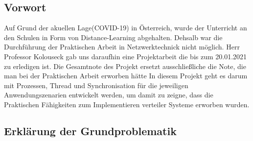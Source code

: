 \documentclass[a4paper,12pt]{exam}
\begin{document}
\subsection{Vorwort}
Auf Grund der akuellen Lage(COVID-19) in Österreich, wurde der Unterricht an den Schulen
in Form von Distance-Learning abgehalten. Dehsalb war die Durchführung der Praktischen Arbeit in
Netzwerktechnick nicht möglich. Herr Professor Kolouseck gab uns daraufhin eine Projektarbeit die bis zum 
20.01.2021 zu erledigen ist. Die Gesamtnote des Projekt ersetzt ausschließliche die Note,
die man bei der Praktischen Arbeit erworben hätte In diesem Projekt geht es darum mit Prozessen, Thread und Synchronisation
für die jeweiligen Anwendungszenarien entwickelt werden, um damit zu zeigne, dass die Praktischen
Fähigkeiten zum Implementieren verteiler Systeme erworben wurden.

\subsection{Erklärung der Grundproblematik}


\begin{verbatim}
\end{verbatim}
\end{document}
